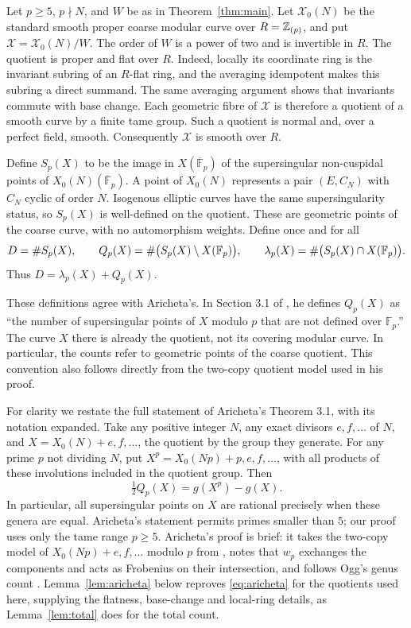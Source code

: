 \documentclass[11pt,a4paper]{article}
\theoremstyle{remark}\newtheorem{remark}[theorem]{Remark}
\numberwithin{equation}{section}
\newcommand{\kk}{\overline{\mathbb F}_p}
\begin{document}
	Let $p\geq5$, $p\nmid N$, and $W$ be as in Theorem~\ref{thm:main}. Let $\mathscr X_0(N)$ be the standard smooth proper coarse modular curve over $R=\mathbb Z_{(p)}$, and put $\mathscr X=\mathscr X_0(N)/W$. The order of $W$ is a power of two and is invertible in $R$. The quotient is proper and flat over $R$. Indeed, locally its coordinate ring is the invariant subring of an $R$-flat ring, and the averaging idempotent makes this subring a direct summand. The same averaging argument shows that invariants commute with base change. Each geometric fibre of $\mathscr X$ is therefore a quotient of a smooth curve by a finite tame group. Such a quotient is normal and, over a perfect field, smooth. Consequently $\mathscr X$ is smooth over $R$.
	
	Define $S_p(X)$ to be the image in $X(\kk)$ of the supersingular non-cuspidal points of $X_0(N)(\kk)$. A point of $X_0(N)$ represents a pair $(E,C_N)$ with $C_N$ cyclic of order $N$. Isogenous elliptic curves have the same supersingularity status, so $S_p(X)$ is well-defined on the quotient. These are geometric points of the coarse curve, with no automorphism weights. Define once and for all
	\begin{equation}\label{eq:counts}
		D=\#S_p(X),\qquad
		Q_p(X)=\#\bigl(S_p(X)\setminus X(\mathbb F_p)\bigr),\qquad
		\lambda_p(X)=\#\bigl(S_p(X)\cap X(\mathbb F_p)\bigr).
	\end{equation}
	Thus $D=\lambda_p(X)+Q_p(X)$.
	
	These definitions agree with Aricheta's. In Section 3.1 of \cite{Aricheta}, he defines $Q_p(X)$ as ``the number of supersingular points of $X$ modulo $p$ that are not defined over $\mathbb F_p$.'' The curve $X$ there is already the quotient, not its covering modular curve. In particular, the counts refer to geometric points of the coarse quotient. This convention also follows directly from the two-copy quotient model used in his proof.
	
	For clarity we restate the full statement of Aricheta's Theorem 3.1, with its notation expanded. Take any positive integer $N$, any exact divisors $e,f,\ldots$ of $N$, and $X=X_0(N)+e,f,\ldots$, the quotient by the group they generate. For any prime $p$ not dividing $N$, put $X^p=X_0(Np)+p,e,f,\ldots$, with all products of these involutions included in the quotient group. Then
	\begin{equation}\label{eq:aricheta}
		\tfrac12Q_p(X)=g(X^p)-g(X).
	\end{equation}
	In particular, all supersingular points on $X$ are rational precisely when these genera are equal. Aricheta's statement permits primes smaller than $5$; our proof uses only the tame range $p\geq5$. Aricheta's proof is brief: it takes the two-copy model of $X_0(Np)+e,f,\ldots$ modulo $p$ from \cite[Section 5]{FH}, notes that $w_p$ exchanges the components and acts as Frobenius on their intersection, and follows Ogg's genus count \cite{OggRed}. Lemma~\ref{lem:aricheta} below reproves \eqref{eq:aricheta} for the quotients used here, supplying the flatness, base-change and local-ring details, as Lemma~\ref{lem:total} does for the total count.
	
\end{document}
